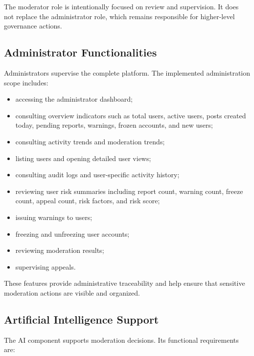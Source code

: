 The moderator role is intentionally focused on review and supervision. It does not replace the administrator role, which remains responsible for higher-level governance actions.

\subsection{Administrator Functionalities}

Administrators supervise the complete platform. The implemented administration scope includes:

\begin{itemize}
    \item accessing the administrator dashboard;
    \item consulting overview indicators such as total users, active users, posts created today, pending reports, warnings, frozen accounts, and new users;
    \item consulting activity trends and moderation trends;
    \item listing users and opening detailed user views;
    \item consulting audit logs and user-specific activity history;
    \item reviewing user risk summaries including report count, warning count, freeze count, appeal count, risk factors, and risk score;
    \item issuing warnings to users;
    \item freezing and unfreezing user accounts;
    \item reviewing moderation results;
    \item supervising appeals.
\end{itemize}

These features provide administrative traceability and help ensure that sensitive moderation actions are visible and organized.

\subsection{Artificial Intelligence Support}

The AI component supports moderation decisions. Its functional requirements are:


